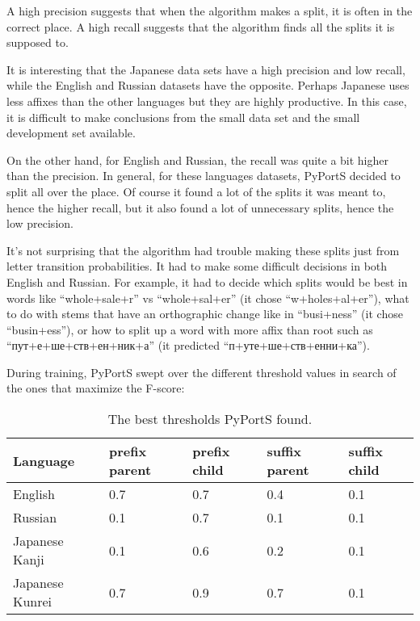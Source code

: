 \documentclass[paper=a4, fontsize=11pt]{article}
\begin{document}
A high precision suggests that when the algorithm makes a split, it is often in the correct place. A high recall suggests that the algorithm finds all the splits it is supposed to.

It is interesting that the Japanese data sets have a high precision and low recall, while the English and Russian datasets have the opposite. Perhaps Japanese uses less affixes than the other languages but they are highly productive. In this case, it is difficult to make conclusions from the small data set and the small development set available.

On the other hand, for English and Russian, the recall was quite a bit higher than the precision. In general, for these languages datasets, PyPortS decided to split all over the place. Of course it found a lot of the splits it was meant to, hence the higher recall, but it also found a lot of unnecessary splits, hence the low precision.

It's not surprising that the algorithm had trouble making these splits just from letter transition probabilities. It had to make some difficult decisions in both English and Russian. For example, it had to decide which splits would be best in words like ``whole+sale+r'' vs ``whole+sal+er'' (it chose ``w+holes+al+er''), what to do with stems that have an orthographic change like in ``busi+ness'' (it chose ``busin+ess''), or how to split up a word with more affix than root such as ``пут+е+ше+ств+ен+ник+а'' (it predicted ``п+уте+ше+ств+енни+ка'').

During training, PyPortS swept over the different threshold values in search of the ones that maximize the F-score:

\begin{table}[!htbp]
\centering
\label{my-label}
\begin{tabular}{|l|llll|}
\hline
Language            & \multicolumn{1}{l|}{prefix parent} & \multicolumn{1}{l|}{prefix child} & \multicolumn{1}{l|}{suffix parent} & suffix child \\ \hline
English             & 0.7                                & 0.7                               & 0.4                                & 0.1          \\ \cline{1-1}
Russian             & 0.1                                & 0.7                               & 0.1                                & 0.1          \\ \cline{1-1}
Japanese Kanji    & 0.1                                & 0.6                               & 0.2                                & 0.1          \\ \cline{1-1}
Japanese Kunrei   & 0.7                                & 0.9                               & 0.7                                & 0.1          \\ \hline
\end{tabular}
\caption{The best thresholds PyPortS found.}
\end{table}
\end{document}
